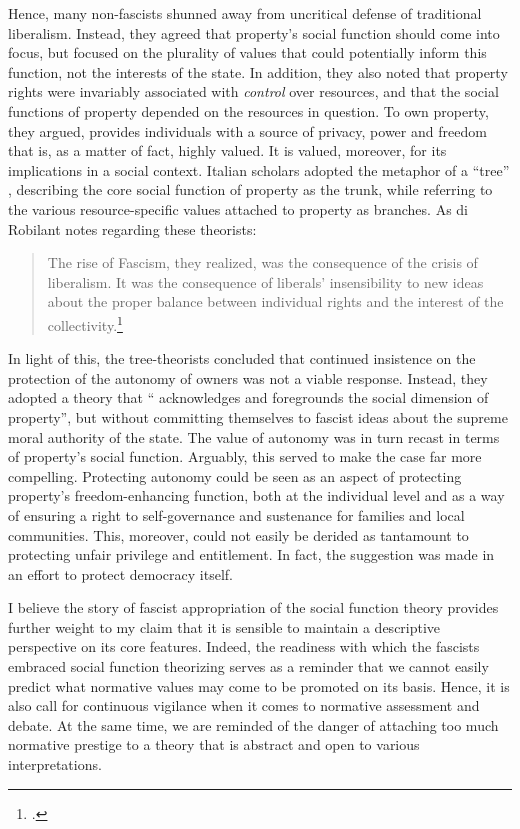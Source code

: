 Hence, many non-fascists shunned away from uncritical defense of traditional liberalism. Instead, they agreed that property's social function should come into focus, but focused on the plurality of values that could potentially inform this function, not the interests of the state. In addition, they also noted that property rights were invariably associated with {\it control} over resources, and that the social functions of property depended on the resources in question. To own property, they argued, provides individuals with a source of privacy, power and freedom that is, as a matter of fact, highly valued. It is valued, moreover, for its implications in a social context. Italian scholars adopted the metaphor of a ``tree'' , describing the core social function of property as the trunk, while referring to the various resource-specific values attached to property as branches. As di Robilant notes regarding these theorists:

\begin{quote}
The rise of Fascism, they realized, was the
consequence of the crisis of liberalism. It was the consequence of liberals' insensibility to new ideas about the proper balance between individual rights and the interest of the collectivity.\footcite[907]{robilant13}
\end{quote}

In light of this, the tree-theorists concluded that continued insistence on the protection of the autonomy of owners was not a viable response. Instead, they adopted a theory that `` acknowledges and foregrounds the social dimension of property'', but without committing themselves to fascist ideas about the supreme moral authority of the state. The value of autonomy was in turn recast in terms of property's social function. Arguably, this served to make the case far more compelling. Protecting autonomy could be seen as an aspect of protecting property's freedom-enhancing function, both at the individual level and as a way of ensuring a right to self-governance and sustenance for families and local communities. This, moreover, could not easily be derided as tantamount to protecting unfair privilege and entitlement. In fact, the suggestion was made in an effort to protect democracy itself.

I believe the story of fascist appropriation of the social function theory provides further weight to my claim that it is sensible to  maintain a descriptive perspective on its core features. Indeed, the readiness with which the fascists embraced social function theorizing serves as a reminder that we cannot easily predict what normative values may come to be promoted on its basis. Hence, it is also call for continuous vigilance when it comes to normative assessment and debate. At the same time, we are reminded of the danger of attaching too much normative prestige to a theory that is abstract and open to various interpretations.

